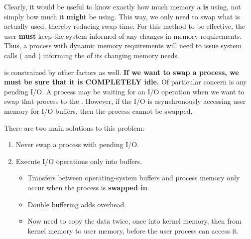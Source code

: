 Clearly, it would be useful to know exactly how much memory a   \textbf{is} using, not simply how much it \textbf{might} be using.
This way, we only need to swap what is actually used, thereby reducing swap time.
For this method to be effective, the user \textbf{must} keep the system informed of any changes in memory requirements.
Thus, a process with dynamic memory requirements will need to issue system calls ( and ) informing the  of its changing memory needs.

 is constrained by other factors as well.
\textbf{If we want to swap a process, we must be sure that it is COMPLETELY idle.}
Of particular concern is any pending I/O.
A process may be waiting for an I/O operation when we want to swap that process to the .
However, if the I/O is asynchronously accessing user memory for I/O buffers, then the process cannot be swapped.

There are two main solutions to this problem:
\begin{enumerate}[noitemsep]
\item Never swap a process with pending I/O.
\item Execute I/O operations only into  buffers.
  \begin{itemize}[noitemsep]
  \item Transfers between operating-system buffers and process memory only occur when the process is \textbf{swapped in}.
  \item Double buffering adds overhead.
  \item Now need to copy the data twice, once into kernel memory, then from kernel memory to user memory, before the user process can access it.
  \end{itemize}
\end{enumerate}


